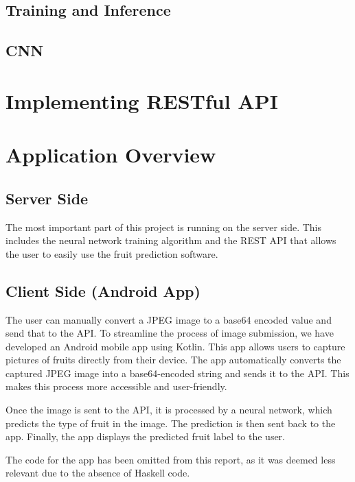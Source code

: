 \documentclass[12pt,a4paper]{article}
\begin{document}
\subsection{Training and Inference}

% 


\subsection{CNN}


\section{Implementing RESTful API}



\section{Application Overview}

\subsection{Server Side}
The most important part of this project is running on the server side. This includes the neural network training algorithm and the REST API that allows the user to easily use the fruit prediction software.

\subsection{Client Side (Android App)}
The user can manually convert a JPEG image to a base64 encoded value and send that to the API.
To streamline the process of image submission, we have developed an Android mobile app using Kotlin. This app allows users to capture pictures of fruits directly from their device. The app automatically converts the captured JPEG image into a base64-encoded string and sends it to the API. This makes this process more accessible and user-friendly.

Once the image is sent to the API, it is processed by a neural network, which predicts the type of fruit in the image. The prediction is then sent back to the app. Finally, the app displays the predicted fruit label to the user.

The code for the app has been omitted from this report, as it was deemed less relevant due to the absence of Haskell code.



% 

% 

% 

% 

% 





\end{document}
